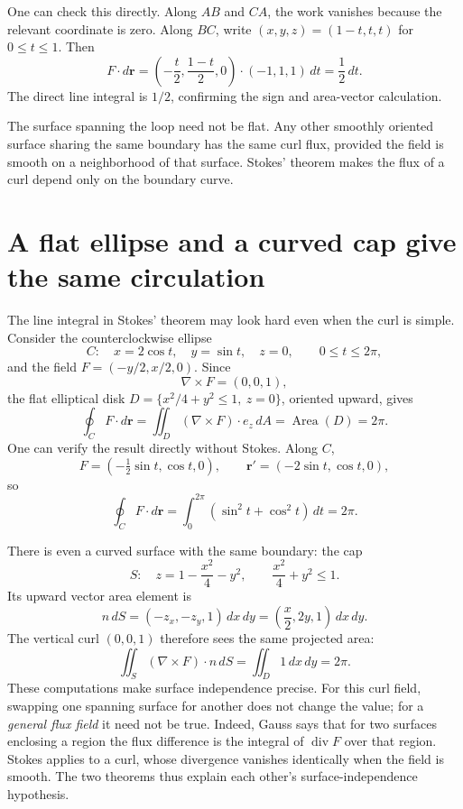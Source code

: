One can check this directly. Along \(AB\) and \(CA\), the work vanishes because the relevant coordinate is zero. Along \(BC\), write \((x,y,z)=(1-t,t,t)\) for \(0\le t\le1\). Then
\[
 F\cdot d\mathbf r
 =\left(-\frac t2,\frac{1-t}{2},0\right)
      \cdot(-1,1,1)\,dt
 =\frac12\,dt.
\]
The direct line integral is \(1/2\), confirming the sign and area-vector calculation.

The surface spanning the loop need not be flat. Any other smoothly oriented surface sharing the same boundary has the same curl flux, provided the field is smooth on a neighborhood of that surface. Stokes' theorem makes the flux of a curl depend only on the boundary curve.

\section{A flat ellipse and a curved cap give the same circulation}

The line integral in Stokes' theorem may look hard even when the curl is simple. Consider the counterclockwise ellipse
\[
 C:\quad x=2\cos t,\quad y=\sin t,\quad z=0,
 \qquad0\le t\le2\pi,
\]
and the field $F=(-y/2,x/2,0)$. Since
\[
 \nabla\times F=(0,0,1),
\]
the flat elliptical disk $D=\{x^2/4+y^2\le1,\ z=0\}$, oriented upward, gives
\[
 \oint_C F\cdot d\mathbf r
 =\iint_D (\nabla\times F)\cdot e_z\,dA
 =\operatorname{Area}(D)=2\pi.
\]
One can verify the result directly without Stokes. Along $C$,
\[
 F=(-\tfrac12\sin t,\cos t,0),
 \qquad
 \mathbf r'=(-2\sin t,\cos t,0),
\]
so
\[
 \boxed{\oint_C F\cdot d\mathbf r
 =\int_0^{2\pi}(\sin^2t+\cos^2t)\,dt=2\pi.}
\]

There is even a curved surface with the same boundary: the cap
\[
 S:\quad z=1-\frac{x^2}{4}-y^2,
 \qquad \frac{x^2}{4}+y^2\le1.
\]
Its upward vector area element is
\[
 n\,dS=(-z_x,-z_y,1)\,dx\,dy
 =\left(\frac x2,2y,1\right)\,dx\,dy.
\]
The vertical curl $(0,0,1)$ therefore sees the same projected area:
\[
 \iint_S(\nabla\times F)\cdot n\,dS
 =\iint_D1\,dx\,dy=2\pi.
\]
These computations make surface independence precise. For this curl field, swapping one spanning surface for another does not change the value; for a \emph{general flux field} it need not be true. Indeed, Gauss says that for two surfaces enclosing a region the flux difference is the integral of $\operatorname{div}F$ over that region. Stokes applies to a curl, whose divergence vanishes identically when the field is smooth. The two theorems thus explain each other's surface-independence hypothesis.

